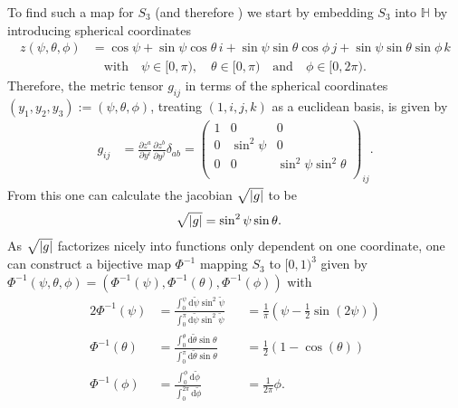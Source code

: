 To find such a map for $S_3$ (and therefore \SUTwo) we start by embedding $S_3$ into $\mathbb{H}$ by introducing spherical coordinates
\begin{align*}
 z (\psi, \theta, \phi) & =
 \cos \psi + \sin \psi \cos \theta \, i + \sin \psi \sin \theta \cos \phi \, j + \sin \psi \sin \theta \sin \phi \, k                                \\
                        & \quad \textrm{with} \quad \psi \in [0,\pi), \quad \theta \in [0,\pi) \quad \textrm{and} \quad \phi \in [0,2\pi) \textrm{.}
\end{align*}
Therefore, the metric tensor $g_{ij}$ in terms of the spherical coordinates $(y_1, y_2, y_3) := (\psi, \theta, \phi)$, treating $(1,i,j,k)$ as a euclidean basis, is given by
\begin{align*}
 g_{ij} & = \frac{\partial z^a}{\partial y^i} \frac{\partial z^b}{\partial y^j} \delta_{ab} = \begin{pmatrix}
  1 & 0           & 0                         \\
  0 & \sin^2 \psi & 0                         \\
  0 & 0           & \sin^2 \psi \sin^2 \theta \\
 \end{pmatrix}_{ij} \textrm{.}
\end{align*}
From this one can calculate the jacobian $\sqrt{\abs{g}}$ to be
\begin{align*}
 \sqrt{\abs{g}} & = \sin^2 \psi \sin \theta \textrm{.}
\end{align*}
As $\sqrt{\abs{g}}$ factorizes nicely into functions only dependent on one coordinate, one can construct a bijective map $\Phi^{-1}$ mapping $S_3$ to $[0,1)^3$ given by $\Phi^{-1}(\psi,\theta,\phi) = \left(\Phi^{-1} (\psi), \Phi^{-1}(\theta), \Phi^{-1} (\phi) \right)$ with
\begin{alignat*}{2}
 \Phi^{-1} (\psi)   & = \frac{\int_0^{\psi}\textrm{d}\tilde{\psi} \sin^2 \tilde{\psi}}{\int_0^\pi \textrm{d} \tilde{\psi} \sin^2 \tilde{\psi}} &  & = \frac{1}{\pi}  \left( \psi - \frac{1}{2} \sin( 2 \psi) \right) \\
 \Phi^{-1} (\theta) & = \frac{\int_0^{\theta}\textrm{d}\tilde{\theta} \sin \theta}{\int_0^\pi \textrm{d}\tilde{\theta} \sin \theta}            &  & = \frac{1}{2} \left( 1-\cos(\theta) \right)                      \\
 \Phi^{-1} (\phi)   & = \frac{\int_0^{\phi}\textrm{d}\tilde{\phi} }{\int_0^{2 \pi} \textrm{d} \tilde{\phi}}                                    &  & = \frac{1}{2 \pi} \phi \textrm{.}
\end{alignat*}
